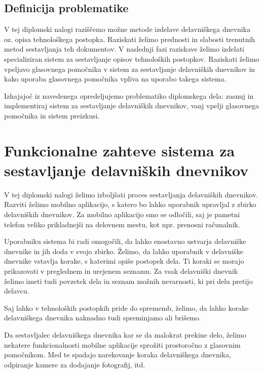 \documentclass[a4paper, 12pt]{book}
\begin{document}



\subsection{Definicija problematike}

V tej diplomski nalogi raziščemo možne metode izdelave delavniškega dnevnika oz. opisa tehnološkega postopka.
Raziskati želimo prednosti in slabosti trenutnih metod sestavljanja teh dokumentov.
V naslednji fazi raziskave želimo izdelati specializiran sistem za sestavljanje opisov tehnoloških postopkov.
Raziskati želimo vpeljavo glasovnega pomočnika v sistem za sestavljanje delavniških dnevnikov in kako uporaba glasovnega pomočnika vpliva na uporabo takega sistema.


Izhajajoč iz navedenega opredeljujemo problematiko diplomskega dela: zasnuj in implementiraj sistem za sestavljanje delavniških dnevnikov, vanj vpelji glasovnega pomočnika in sistem preizkusi.

\section{Funkcionalne zahteve sistema za sestavljanje delavniških dnevnikov}

V tej diplomski nalogi želimo izboljšati proces sestavljanja delavniških dnevnikov.
Razviti želimo mobilno aplikacijo, s katero bo lahko uporabnik upravljal z zbirko delavniških dnevnikov.
Za mobilno aplikacijo smo se odločili, saj je pametni telefon veliko prikladnejši na delovnem mestu, kot npr. prenosni računalnik.

Uporabniku sistema bi radi omogočili, da lahko enostavno ustvarja delavniške dnevnike in jih doda v svojo zbirko.
Želimo, da lahko uporabnik v delavniške dnevnike vstavlja korake, s katerimi opiše postopek dela.
Ti koraki se morajo prikazovati v preglednem in urejenem seznamu.
Za vsak delavniški dnevnik želimo imeti tudi povzetek dela in seznam možnih nevarnosti, ki pri delu pretijo delavcu.

Saj lahko v tehnoloških postopkih pride do sprememb, želimo, da lahko korake delavniškega dnevnika naknadno tudi spreminjamo ali brišemo.

Da sestavljalec delavniškega dnevnika kar se da malokrat prekine delo, želimo nekatere funkcionalnosti mobilne aplikacije sprožiti prostoročno z glasovnim pomočnikom.
Med te spadajo narekovanje koraka delavniškega dnevnika, odpiranje kamere za dodajanje fotografij, itd.
\end{document}
